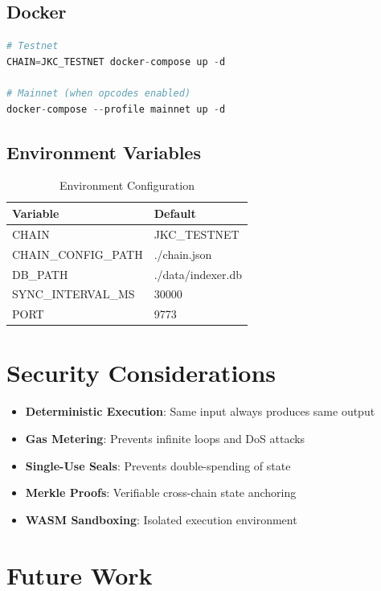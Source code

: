 \documentclass[a4paper,11pt]{article}
\begin{document}
\subsection{Docker}

\begin{lstlisting}[language=Python, caption={Docker Compose}]
# Testnet
CHAIN=JKC_TESTNET docker-compose up -d

# Mainnet (when opcodes enabled)
docker-compose --profile mainnet up -d
\end{lstlisting}

\subsection{Environment Variables}

\begin{table}[h]
\centering
\begin{tabular}{@{}ll@{}}
\toprule
\textbf{Variable} & \textbf{Default} \\
\midrule
CHAIN & JKC\_TESTNET \\
CHAIN\_CONFIG\_PATH & ./chain.json \\
DB\_PATH & ./data/indexer.db \\
SYNC\_INTERVAL\_MS & 30000 \\
PORT & 9773 \\
\bottomrule
\end{tabular}
\caption{Environment Configuration}
\end{table}

\section{Security Considerations}

\begin{itemize}
    \item \textbf{Deterministic Execution}: Same input always produces same output
    \item \textbf{Gas Metering}: Prevents infinite loops and DoS attacks
    \item \textbf{Single-Use Seals}: Prevents double-spending of state
    \item \textbf{Merkle Proofs}: Verifiable cross-chain state anchoring
    \item \textbf{WASM Sandboxing}: Isolated execution environment
\end{itemize}

\section{Future Work}
\end{document}
